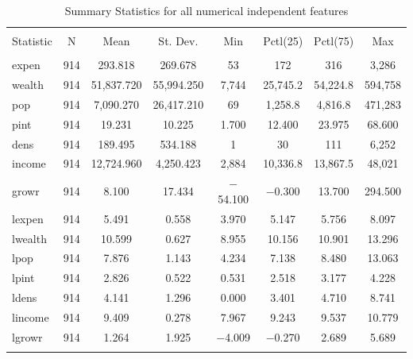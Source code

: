 \documentclass[11pt]{article}\usepackage[]{graphicx}\usepackage[]{color}
\begin{document}
\begin{center}

\begin{table}[H] \centering 
  \caption{Summary Statistics for all numerical independent features} 
  \label{descrips} 
\begin{tabular}{@{\extracolsep{5pt}}lccccccc} 
\\[-1.8ex]\hline 
\hline \\[-1.8ex] 
Statistic & \multicolumn{1}{c}{N} & \multicolumn{1}{c}{Mean} & \multicolumn{1}{c}{St. Dev.} & \multicolumn{1}{c}{Min} & \multicolumn{1}{c}{Pctl(25)} & \multicolumn{1}{c}{Pctl(75)} & \multicolumn{1}{c}{Max} \\ 
\hline \\[-1.8ex] 
expen & 914 & 293.818 & 269.678 & 53 & 172 & 316 & 3,286 \\ 
wealth & 914 & 51,837.720 & 55,994.250 & 7,744 & 25,745.2 & 54,224.8 & 594,758 \\ 
pop & 914 & 7,090.270 & 26,417.210 & 69 & 1,258.8 & 4,816.8 & 471,283 \\ 
pint & 914 & 19.231 & 10.225 & 1.700 & 12.400 & 23.975 & 68.600 \\ 
dens & 914 & 189.495 & 534.188 & 1 & 30 & 111 & 6,252 \\ 
income & 914 & 12,724.960 & 4,250.423 & 2,884 & 10,336.8 & 13,867.5 & 48,021 \\ 
growr & 914 & 8.100 & 17.434 & $-$54.100 & $-$0.300 & 13.700 & 294.500 \\ 
lexpen & 914 & 5.491 & 0.558 & 3.970 & 5.147 & 5.756 & 8.097 \\ 
lwealth & 914 & 10.599 & 0.627 & 8.955 & 10.156 & 10.901 & 13.296 \\ 
lpop & 914 & 7.876 & 1.143 & 4.234 & 7.138 & 8.480 & 13.063 \\ 
lpint & 914 & 2.826 & 0.522 & 0.531 & 2.518 & 3.177 & 4.228 \\ 
ldens & 914 & 4.141 & 1.296 & 0.000 & 3.401 & 4.710 & 8.741 \\ 
lincome & 914 & 9.409 & 0.278 & 7.967 & 9.243 & 9.537 & 10.779 \\ 
lgrowr & 914 & 1.264 & 1.925 & $-$4.009 & $-$0.270 & 2.689 & 5.689 \\ 
\hline \\[-1.8ex] 
\end{tabular} 
\end{table} 

\end{center} 
\end{document}
